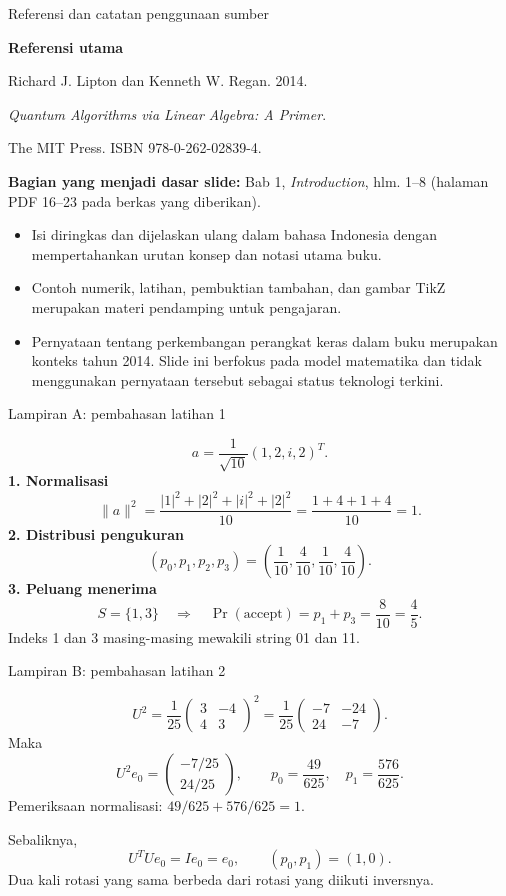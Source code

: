 \documentclass[aspectratio=169,11pt]{beamer}
\begin{document}
\begin{frame}{Referensi dan catatan penggunaan sumber}

\textbf{Referensi utama}
\par\medskip
Richard J. Lipton dan Kenneth W. Regan. 2014.\par
\textit{Quantum Algorithms via Linear Algebra: A Primer}.\par
The MIT Press. ISBN 978-0-262-02839-4.
\par\medskip
\textbf{Bagian yang menjadi dasar slide:} Bab 1, \textit{Introduction}, hlm. 1--8 (halaman PDF 16--23 pada berkas yang diberikan).
\begin{itemize}
\item Isi diringkas dan dijelaskan ulang dalam bahasa Indonesia dengan mempertahankan urutan konsep dan notasi utama buku.
\item Contoh numerik, latihan, pembuktian tambahan, dan gambar TikZ merupakan materi pendamping untuk pengajaran.
\item Pernyataan tentang perkembangan perangkat keras dalam buku merupakan konteks tahun 2014. Slide ini berfokus pada model matematika dan tidak menggunakan pernyataan tersebut sebagai status teknologi terkini.
\end{itemize}

\end{frame}

\appendix

\begin{frame}{Lampiran A: pembahasan latihan 1}

\[
 a=\frac1{\sqrt{10}}(1,2,i,2)^T.
\]
\textbf{1. Normalisasi}
\[
 \|a\|^2=\frac{|1|^2+|2|^2+|i|^2+|2|^2}{10}
 =\frac{1+4+1+4}{10}=1.
\]
\textbf{2. Distribusi pengukuran}
\[
 (p_0,p_1,p_2,p_3)=\left(\frac1{10},\frac4{10},\frac1{10},\frac4{10}\right).
\]
\textbf{3. Peluang menerima}
\[
 S=\{1,3\}\quad\Longrightarrow\quad
 \Pr(\text{accept})=p_1+p_3=\frac8{10}=\frac45.
\]
Indeks 1 dan 3 masing-masing mewakili string 01 dan 11.

\end{frame}

\begin{frame}{Lampiran B: pembahasan latihan 2}

\[
 U^2=\frac1{25}\begin{pmatrix}3&-4\\4&3\end{pmatrix}^2
 =\frac1{25}\begin{pmatrix}-7&-24\\24&-7\end{pmatrix}.
\]
Maka
\[
 U^2e_0=\begin{pmatrix}-7/25\\24/25\end{pmatrix},\qquad
 p_0=\frac{49}{625},\quad p_1=\frac{576}{625}.
\]
Pemeriksaan normalisasi: $49/625+576/625=1$.
\par\medskip
Sebaliknya,
\[
 U^TUe_0=Ie_0=e_0,\qquad (p_0,p_1)=(1,0).
\]
Dua kali rotasi yang sama berbeda dari rotasi yang diikuti inversnya.

\end{frame}
\end{document}
